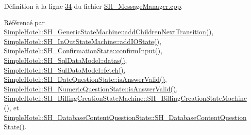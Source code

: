 Définition à la ligne \hyperlink{SH__MessageManager_8cpp_source_l00034}{34} du fichier \hyperlink{SH__MessageManager_8cpp_source}{S\-H\-\_\-\-Message\-Manager.\-cpp}.



Référencé par \hyperlink{classSimpleHotel_1_1SH__GenericStateMachine_a3771c91002bec6ab9414703251cc7825}{Simple\-Hotel\-::\-S\-H\-\_\-\-Generic\-State\-Machine\-::add\-Children\-Next\-Transition()}, \hyperlink{classSimpleHotel_1_1SH__InOutStateMachine_a07ae9f1f74a9a41b26e77a014679a33e}{Simple\-Hotel\-::\-S\-H\-\_\-\-In\-Out\-State\-Machine\-::add\-I\-O\-State()}, \hyperlink{classSimpleHotel_1_1SH__ConfirmationState_a42814c25df062e1f4cf3929dd9f37a85}{Simple\-Hotel\-::\-S\-H\-\_\-\-Confirmation\-State\-::confirm\-Input()}, \hyperlink{classSimpleHotel_1_1SH__SqlDataModel_a5d9fef2dd53b01908f1b7eedfffc1fa5}{Simple\-Hotel\-::\-S\-H\-\_\-\-Sql\-Data\-Model\-::datas()}, \hyperlink{classSimpleHotel_1_1SH__SqlDataModel_ab8b74a08f668025c11c5446d4e4b469b}{Simple\-Hotel\-::\-S\-H\-\_\-\-Sql\-Data\-Model\-::fetch()}, \hyperlink{classSimpleHotel_1_1SH__DateQuestionState_a991fbb7c26a414d054780cd9a1e2221f}{Simple\-Hotel\-::\-S\-H\-\_\-\-Date\-Question\-State\-::is\-Answer\-Valid()}, \hyperlink{classSimpleHotel_1_1SH__NumericQuestionState_acfef357cecf511d31d2c992252b91c40}{Simple\-Hotel\-::\-S\-H\-\_\-\-Numeric\-Question\-State\-::is\-Answer\-Valid()}, \hyperlink{classSimpleHotel_1_1SH__BillingCreationStateMachine_a8c7d39e11d0ced1fd9c27a5550465b86}{Simple\-Hotel\-::\-S\-H\-\_\-\-Billing\-Creation\-State\-Machine\-::\-S\-H\-\_\-\-Billing\-Creation\-State\-Machine()}, et \hyperlink{classSimpleHotel_1_1SH__DatabaseContentQuestionState_a91df6c69a129ca799d29610b3332747d}{Simple\-Hotel\-::\-S\-H\-\_\-\-Database\-Content\-Question\-State\-::\-S\-H\-\_\-\-Database\-Content\-Question\-State()}.


